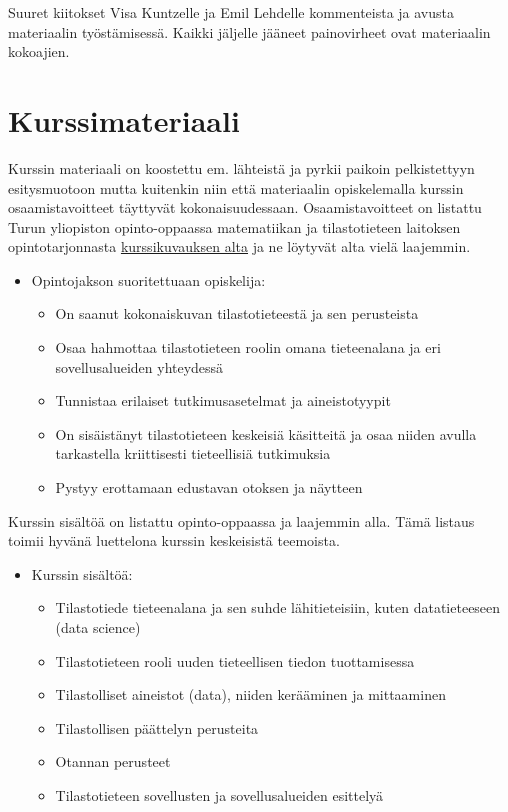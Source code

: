 \documentclass[
]{book}
\providecommand{\tightlist}{%
  \setlength{\itemsep}{0pt}\setlength{\parskip}{0pt}}
\begin{document}
Suuret kiitokset Visa Kuntzelle ja Emil Lehdelle kommenteista ja avusta materiaalin työstämisessä. Kaikki jäljelle jääneet painovirheet ovat materiaalin kokoajien.

\hypertarget{kurssimateriaali}{%
\section*{Kurssimateriaali}\label{kurssimateriaali}}

Kurssin materiaali on koostettu em. lähteistä ja pyrkii paikoin pelkistettyyn esitysmuotoon mutta kuitenkin niin että materiaalin opiskelemalla kurssin osaamistavoitteet täyttyvät kokonaisuudessaan. Osaamistavoitteet on listattu Turun yliopiston opinto-oppaassa matematiikan ja tilastotieteen laitoksen opintotarjonnasta \href{https://opas.peppi.utu.fi/fi/opintojakso/TILM3701/90798}{kurssikuvauksen alta} ja ne löytyvät alta vielä laajemmin.

\begin{itemize}
\tightlist
\item
  Opintojakson suoritettuaan opiskelija:

  \begin{itemize}
  \tightlist
  \item
    On saanut kokonaiskuvan tilastotieteestä ja sen perusteista
  \item
    Osaa hahmottaa tilastotieteen roolin omana tieteenalana ja eri sovellusalueiden yhteydessä
  \item
    Tunnistaa erilaiset tutkimusasetelmat ja aineistotyypit
  \item
    On sisäistänyt tilastotieteen keskeisiä käsitteitä ja osaa niiden avulla tarkastella kriittisesti tieteellisiä tutkimuksia
  \item
    Pystyy erottamaan edustavan otoksen ja näytteen
  \end{itemize}
\end{itemize}

Kurssin sisältöä on listattu opinto-oppaassa ja laajemmin alla. Tämä listaus toimii hyvänä luettelona kurssin keskeisistä teemoista.

\begin{itemize}
\tightlist
\item
  Kurssin sisältöä:

  \begin{itemize}
  \tightlist
  \item
    Tilastotiede tieteenalana ja sen suhde lähitieteisiin, kuten datatieteeseen (data science)
  \item
    Tilastotieteen rooli uuden tieteellisen tiedon tuottamisessa
  \item
    Tilastolliset aineistot (data), niiden kerääminen ja mittaaminen
  \item
    Tilastollisen päättelyn perusteita
  \item
    Otannan perusteet
  \item
    Tilastotieteen sovellusten ja sovellusalueiden esittelyä
  \end{itemize}
\end{itemize}
\end{document}
